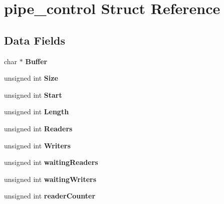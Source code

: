 \hypertarget{structpipe__control}{}\section{pipe\+\_\+control Struct Reference}
\label{structpipe__control}
\subsection*{Data Fields}
\begin{DoxyCompactItemize}
\item 
\mbox{\label{structpipe__control_abc828a467b9ee55d55fc36a0a432e9d7}} 
char $\ast$ {\bfseries Buffer}
\item 
\mbox{\label{structpipe__control_abe8f21632b84491954788225de261a47}} 
unsigned int {\bfseries Size}
\item 
\mbox{\label{structpipe__control_a33caa8689a263c95e218d82447ec4e55}} 
unsigned int {\bfseries Start}
\item 
\mbox{\label{structpipe__control_a92ed7e22ca7d8e11069ac018fc880b51}} 
unsigned int {\bfseries Length}
\item 
\mbox{\label{structpipe__control_a513a5fc95ee529d6bee7d041cc0ead41}} 
unsigned int {\bfseries Readers}
\item 
\mbox{\label{structpipe__control_a921bde45f2f63de69f414d18afadd25f}} 
unsigned int {\bfseries Writers}
\item 
\mbox{\label{structpipe__control_a987ad7fddf2ca3ad359e04f2efe13337}} 
unsigned int {\bfseries waiting\+Readers}
\item 
\mbox{\label{structpipe__control_ae7e29f39c3736580aacae80f66b697e7}} 
unsigned int {\bfseries waiting\+Writers}
\item 
\mbox{\label{structpipe__control_a2609c10e311072c1c863535a4179b202}} 
unsigned int {\bfseries reader\+Counter}
\item 
\mbox{\label{structpipe__control_a85b334f06c27c2cd86cbf17aed6a2c1e}} 

\end{DoxyCompactItemize}
